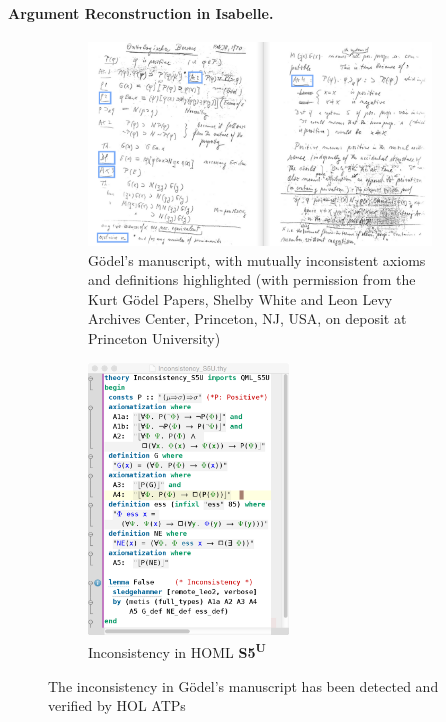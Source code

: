 \documentclass{llncs}
\newcommand{\logic}[1]{\textbf{#1}\xspace}
\newcommand{\SFiveU}{\logic{S5\textsuperscript{U}}}
\begin{document}
\paragraph{Argument Reconstruction in Isabelle.}  \label{sec:arg2}
\begin{figure}[t]
  \centering
  \begin{subfigure}[t]{0.715\textwidth}
    \includegraphics[width=\textwidth]{./Manuscript2.png}
    \caption{G\"{o}del's manuscript, with mutually inconsistent axioms and
      definitions highlighted (with permission from the Kurt G\"odel Papers, Shelby White and Leon Levy Archives Center, Princeton, NJ, USA, on deposit at Princeton University)} \label{GoedelScript} 
  \end{subfigure}
   \begin{subfigure}[t]{0.28\textwidth}
     \includegraphics[width=\textwidth,height=7.2cm]{./Inconsistency_S5U_direct.png}
     \caption{Inconsistency in HOML \SFiveU} \label{Inconsistency_S5U} 
   \end{subfigure}
 \caption{The inconsistency in G\"{o}del's manuscript has been
   detected and verified by HOL ATPs} 
\end{figure}
\end{document}
